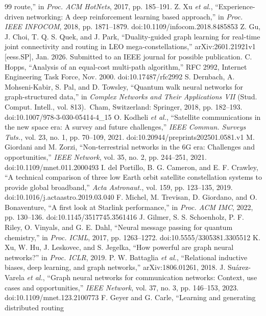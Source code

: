 \documentclass[journal]{IEEEtran}
\begin{document}
\begin{thebibliography}{99}
route,'' in \emph{Proc. ACM HotNets}, 2017, pp. 185--191.
 Z. Xu \emph{et al.}, ``Experience-driven networking: A deep reinforcement
learning based approach,'' in \emph{Proc. IEEE INFOCOM}, 2018, pp. 1871--1879. doi:10.1109/infocom.2018.8485853
 Z. Gu, J. Choi, T. Q. S. Quek, and J. Park, ``Duality-guided graph
learning for real-time joint connectivity and routing in LEO mega-constellations,''
arXiv:2601.21921v1 [eess.SP], Jan. 2026. Submitted to an IEEE journal for possible publication.
 C. Hopps, ``Analysis of an equal-cost multi-path algorithm,'' RFC 2992,
Internet Engineering Task Force, Nov. 2000. doi:10.17487/rfc2992
 S. Dernbach, A. Mohseni-Kabir, S. Pal, and D. Towsley, ``Quantum walk
neural networks for graph-structured data,'' in \emph{Complex Networks and Their
Applications VII} (Stud. Comput. Intell., vol. 813).\ Cham, Switzerland: Springer, 2018,
pp. 182--193. doi:10.1007/978-3-030-05414-4\_15
 O. Kodheli \emph{et al.}, ``Satellite communications in the new space
era: A survey and future challenges,'' \emph{IEEE Commun. Surveys Tuts.}, vol. 23, no. 1,
pp. 70--109, 2021. doi:10.20944/preprints202501.0581.v1
 M. Giordani and M. Zorzi, ``Non-terrestrial networks in the 6G era:
Challenges and opportunities,'' \emph{IEEE Network}, vol. 35, no. 2, pp. 244--251, 2021. doi:10.1109/mnet.011.2000493
 I. del Portillo, B. G. Cameron, and E. F. Crawley, ``A technical
comparison of three low Earth orbit satellite constellation systems to provide global
broadband,'' \emph{Acta Astronaut.}, vol. 159, pp. 123--135, 2019. doi:10.1016/j.actaastro.2019.03.040
 F. Michel, M. Trevisan, D. Giordano, and O. Bonaventure, ``A first look
at Starlink performance,'' in \emph{Proc. ACM IMC}, 2022, pp. 130--136. doi:10.1145/3517745.3561416
 J. Gilmer, S. S. Schoenholz, P. F. Riley, O. Vinyals, and G. E. Dahl,
``Neural message passing for quantum chemistry,'' in \emph{Proc. ICML}, 2017, pp. 1263--1272. doi:10.5555/3305381.3305512
 K. Xu, W. Hu, J. Leskovec, and S. Jegelka, ``How powerful are graph neural
networks?'' in \emph{Proc. ICLR}, 2019.
 P. W. Battaglia \emph{et al.}, ``Relational inductive biases, deep
learning, and graph networks,'' arXiv:1806.01261, 2018.
 J. Su\'arez-Varela \emph{et al.}, ``Graph neural networks for
communication networks: Context, use cases and opportunities,'' \emph{IEEE Network}, vol.
37, no. 3, pp. 146--153, 2023. doi:10.1109/mnet.123.2100773
 F. Geyer and G. Carle, ``Learning and generating distributed routing

\end{thebibliography}
\end{document}
